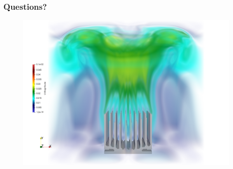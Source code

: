 \documentclass[10pt]{beamer}
\begin{document}
\begin{frame}\frametitle{Questions?}
\begin{center}
\begin{figure}
\includegraphics[width = 1 \textwidth]{obrazki/u_volume2.png} 
\end{figure}
\end{center}
\end{frame}



\appendix

\end{document}
